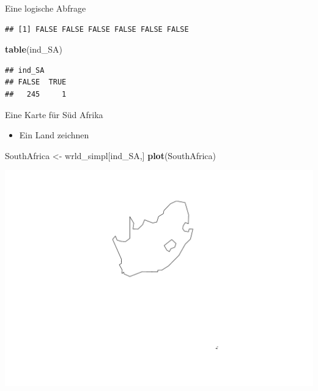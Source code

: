 \documentclass[ignorenonframetext,]{beamer}
\newenvironment{Shaded}{\begin{snugshade}}{\end{snugshade}}
\newcommand{\KeywordTok}[1]{\textcolor[rgb]{0.26,0.66,0.93}{\textbf{#1}}}
\newcommand{\StringTok}[1]{\textcolor[rgb]{0.02,0.61,0.04}{#1}}
\newcommand{\OperatorTok}[1]{\textcolor[rgb]{0.74,0.68,0.62}{#1}}
\newcommand{\NormalTok}[1]{\textcolor[rgb]{0.74,0.68,0.62}{#1}}
\providecommand{\tightlist}{%
  \setlength{\itemsep}{0pt}\setlength{\parskip}{0pt}}
\begin{document}
\begin{frame}[fragile]{Eine logische Abfrage}

\begin{Shaded}
\end{Shaded}

\begin{verbatim}
## [1] FALSE FALSE FALSE FALSE FALSE FALSE
\end{verbatim}

\begin{Shaded}
\begin{Highlighting}[]
\KeywordTok{table}\NormalTok{(ind_SA)}
\end{Highlighting}
\end{Shaded}

\begin{verbatim}
## ind_SA
## FALSE  TRUE 
##   245     1
\end{verbatim}

\end{frame}

\begin{frame}[fragile]{Eine Karte für Süd Afrika}

\begin{itemize}
\tightlist
\item
  Ein Land zeichnen
\end{itemize}

\begin{Shaded}
\begin{Highlighting}[]
\NormalTok{SouthAfrica <-}\StringTok{ }\NormalTok{wrld_simpl[ind_SA,]}
\KeywordTok{plot}\NormalTok{(SouthAfrica)}
\end{Highlighting}
\end{Shaded}

\includegraphics{Geomedizin_files/figure-beamer/unnamed-chunk-56-1.pdf}

\end{frame}
\end{document}
